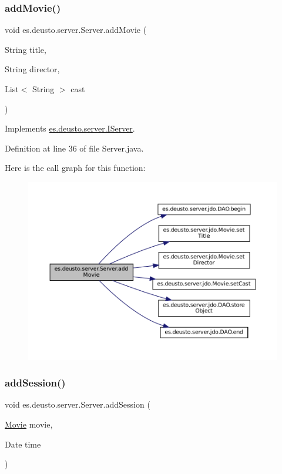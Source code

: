 \subsubsection{\texorpdfstring{addMovie()}{addMovie()}}
{\footnotesize\ttfamily void es.\+deusto.\+server.\+Server.\+add\+Movie (\begin{DoxyParamCaption}\item[{String}]{title,  }\item[{String}]{director,  }\item[{List$<$ String $>$}]{cast }\end{DoxyParamCaption})}



Implements \mbox{\hyperlink{interfacees_1_1deusto_1_1server_1_1_i_server_a393d8689e14b3534dfa425e4c900532e}{es.\+deusto.\+server.\+I\+Server}}.



Definition at line 36 of file Server.\+java.

Here is the call graph for this function\+:
\nopagebreak
\begin{figure}[H]
\begin{center}
\leavevmode
\includegraphics[width=350pt]{classes_1_1deusto_1_1server_1_1_server_a150317903dc393d29f39db81e79131e0_cgraph}
\end{center}
\end{figure}
\mbox{\label{classes_1_1deusto_1_1server_1_1_server_abca83b4649011a8a68af754bbd25e22d}} 
\subsubsection{\texorpdfstring{addSession()}{addSession()}}
{\footnotesize\ttfamily void es.\+deusto.\+server.\+Server.\+add\+Session (\begin{DoxyParamCaption}\item[{\mbox{\hyperlink{classes_1_1deusto_1_1server_1_1jdo_1_1_movie}{Movie}}}]{movie,  }\item[{Date}]{time }\end{DoxyParamCaption})}



